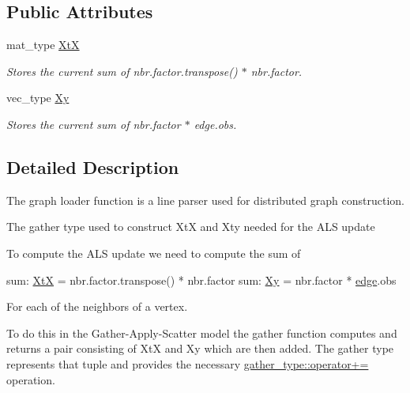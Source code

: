 \subsection*{Public Attributes}
\begin{DoxyCompactItemize}
\item 
\hypertarget{classgather__type_a79352d3ca5b6957aa4b21276c20da59f}{mat\-\_\-type \hyperlink{classgather__type_a79352d3ca5b6957aa4b21276c20da59f}{Xt\-X}}\label{classgather__type_a79352d3ca5b6957aa4b21276c20da59f}

\begin{DoxyCompactList}\small\item\em Stores the current sum of nbr.\-factor.\-transpose() $\ast$ nbr.\-factor. \end{DoxyCompactList}\item 
\hypertarget{classgather__type_a319a1856f1ad204ad8fd13592ab9a201}{vec\-\_\-type \hyperlink{classgather__type_a319a1856f1ad204ad8fd13592ab9a201}{Xy}}\label{classgather__type_a319a1856f1ad204ad8fd13592ab9a201}

\begin{DoxyCompactList}\small\item\em Stores the current sum of nbr.\-factor $\ast$ edge.\-obs. \end{DoxyCompactList}\end{DoxyCompactItemize}


\subsection{Detailed Description}
The graph loader function is a line parser used for distributed graph construction. 

The gather type used to construct Xt\-X and Xty needed for the A\-L\-S update

To compute the A\-L\-S update we need to compute the sum of 
\begin{DoxyCode}
    sum: \hyperlink{classgather__type_a79352d3ca5b6957aa4b21276c20da59f}{XtX} = nbr.factor.transpose() * nbr.factor 
    sum: \hyperlink{classgather__type_a319a1856f1ad204ad8fd13592ab9a201}{Xy}  = nbr.factor * \hyperlink{structedge}{edge}.obs
\end{DoxyCode}
 For each of the neighbors of a vertex.

To do this in the Gather-\/\-Apply-\/\-Scatter model the gather function computes and returns a pair consisting of Xt\-X and Xy which are then added. The gather type represents that tuple and provides the necessary \hyperlink{classgather__type_a672f8aac3ab0b1bb48e857b77307f621}{gather\-\_\-type\-::operator+=} operation. 

